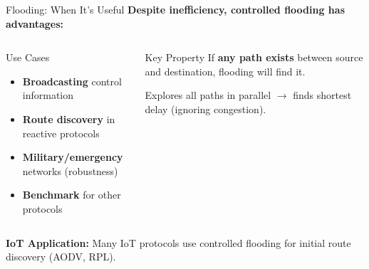 \documentclass[aspectratio=169,11pt]{beamer}
\begin{document}
\begin{frame}{Flooding: When It's Useful}
    \textbf{Despite inefficiency, controlled flooding has advantages:}
    
    \vspace{0.5cm}
    \begin{columns}
        \begin{exampleblock}{Use Cases}
            \begin{itemize}
                \item \textbf{Broadcasting} control information
                \item \textbf{Route discovery} in reactive protocols
                \item \textbf{Military/emergency} networks (robustness)
                \item \textbf{Benchmark} for other protocols
            \end{itemize}
        \end{exampleblock}
        
        \begin{alertblock}{Key Property}
            If \textbf{any path exists} between source and destination, flooding will find it.
            
            \vspace{0.2cm}
            Explores all paths in parallel $\rightarrow$ finds shortest delay (ignoring congestion).
        \end{alertblock}
    \end{columns}
    
    \vspace{0.5cm}
    \textbf{IoT Application:} Many IoT protocols use controlled flooding for initial route discovery (AODV, RPL).
\end{frame}
\end{document}
